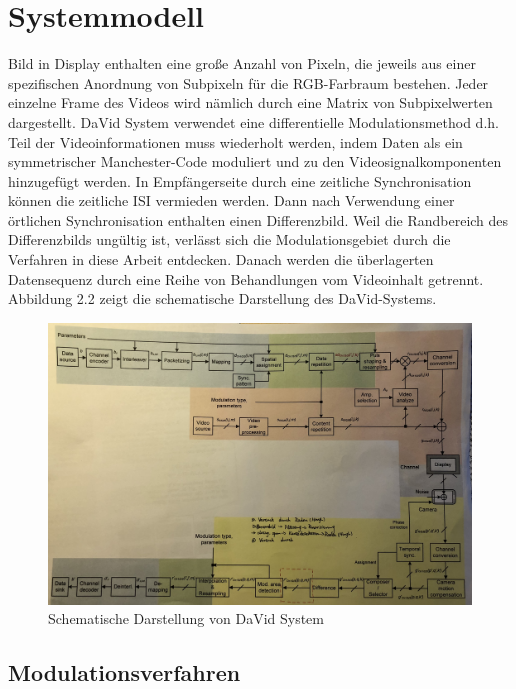 \section{Systemmodell} 
Bild in Display enthalten eine große Anzahl von Pixeln, die jeweils aus einer spezifischen Anordnung von Subpixeln für die RGB-Farbraum bestehen. Jeder einzelne Frame des Videos wird nämlich durch eine Matrix von Subpixelwerten dargestellt. DaVid System verwendet eine differentielle Modulationsmethod d.h. Teil der Videoinformationen muss wiederholt werden, indem Daten als ein symmetrischer Manchester-Code moduliert und zu den Videosignalkomponenten hinzugefügt werden. In Empfängerseite durch eine zeitliche Synchronisation können die zeitliche \gls{ISI} vermieden werden. Dann nach Verwendung einer örtlichen Synchronisation enthalten einen Differenzbild. Weil die Randbereich des Differenzbilds ungültig ist, verlässt sich die Modulationsgebiet durch die Verfahren in diese Arbeit entdecken. Danach werden die überlagerten Datensequenz durch eine Reihe von Behandlungen vom Videoinhalt getrennt. Abbildung 2.2 zeigt die schematische Darstellung des DaVid-Systems. 
\vspace{18pt}

\begin{figure}[htb]
	\centering 
	\includegraphics[keepaspectratio,width=1.0\textwidth]{images/David3.jpg}
	\caption{Schematische Darstellung von DaVid System}
	\label{fig:David2}
\end{figure}


\subsection{Modulationsverfahren}


